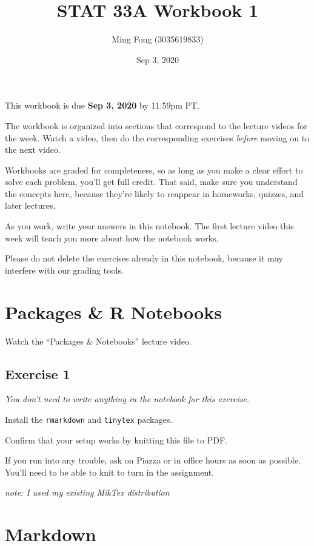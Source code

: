 \documentclass[
]{article}
\title{STAT 33A Workbook 1}
\author{Ming Fong (3035619833)}
\date{Sep 3, 2020}
\begin{document}
\maketitle

This workbook is due \textbf{Sep 3, 2020} by 11:59pm PT.

The workbook is organized into sections that correspond to the lecture
videos for the week. Watch a video, then do the corresponding exercises
\emph{before} moving on to the next video.

Workbooks are graded for completeness, so as long as you make a clear
effort to solve each problem, you'll get full credit. That said, make
sure you understand the concepts here, because they're likely to
reappear in homeworks, quizzes, and later lectures.

As you work, write your answers in this notebook. The first lecture
video this week will teach you more about how the notebook works.

Please do not delete the exercises already in this notebook, because it
may interfere with our grading tools.

\hypertarget{packages-r-notebooks}{%
\section{Packages \& R Notebooks}\label{packages-r-notebooks}}

Watch the ``Packages \& Notebooks'' lecture video.

\hypertarget{exercise-1}{%
\subsection{Exercise 1}\label{exercise-1}}

\emph{You don't need to write anything in the notebook for this
exercise.}

Install the \texttt{rmarkdown} and \texttt{tinytex} packages.

Confirm that your setup works by knitting this file to PDF.

If you run into any trouble, ask on Piazza or in office hours as soon as
possible. You'll need to be able to knit to turn in the assignment.

\emph{note: I used my existing MikTex distribution}

\hypertarget{markdown}{%
\section{Markdown}\label{markdown}}
\end{document}
